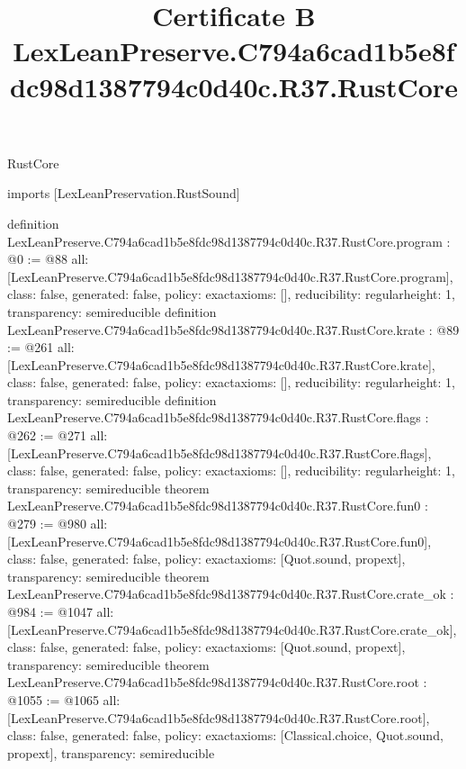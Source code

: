 \begin{lexlean}{RustCore}
\title{Certificate B LexLeanPreserve.C794a6cad1b5e8fdc98d1387794c0d40c.R37.RustCore}
\begin{coremodule}
imports [LexLeanPreservation.RustSound]

definition LexLeanPreserve.C794a6cad1b5e8fdc98d1387794c0d40c.R37.RustCore.program : @0 := @88 {
  all: [LexLeanPreserve.C794a6cad1b5e8fdc98d1387794c0d40c.R37.RustCore.program],
  class: false,
  generated: false,
  policy: exact{axioms: []},
  reducibility: regular{height: 1},
  transparency: semireducible
}
definition LexLeanPreserve.C794a6cad1b5e8fdc98d1387794c0d40c.R37.RustCore.krate : @89 := @261 {
  all: [LexLeanPreserve.C794a6cad1b5e8fdc98d1387794c0d40c.R37.RustCore.krate],
  class: false,
  generated: false,
  policy: exact{axioms: []},
  reducibility: regular{height: 1},
  transparency: semireducible
}
definition LexLeanPreserve.C794a6cad1b5e8fdc98d1387794c0d40c.R37.RustCore.flags : @262 := @271 {
  all: [LexLeanPreserve.C794a6cad1b5e8fdc98d1387794c0d40c.R37.RustCore.flags],
  class: false,
  generated: false,
  policy: exact{axioms: []},
  reducibility: regular{height: 1},
  transparency: semireducible
}
theorem LexLeanPreserve.C794a6cad1b5e8fdc98d1387794c0d40c.R37.RustCore.fun0 : @279 := @980 {
  all: [LexLeanPreserve.C794a6cad1b5e8fdc98d1387794c0d40c.R37.RustCore.fun0],
  class: false,
  generated: false,
  policy: exact{axioms: [Quot.sound, propext]},
  transparency: semireducible
}
theorem LexLeanPreserve.C794a6cad1b5e8fdc98d1387794c0d40c.R37.RustCore.crate_ok : @984 := @1047 {
  all: [LexLeanPreserve.C794a6cad1b5e8fdc98d1387794c0d40c.R37.RustCore.crate_ok],
  class: false,
  generated: false,
  policy: exact{axioms: [Quot.sound, propext]},
  transparency: semireducible
}
theorem LexLeanPreserve.C794a6cad1b5e8fdc98d1387794c0d40c.R37.RustCore.root : @1055 := @1065 {
  all: [LexLeanPreserve.C794a6cad1b5e8fdc98d1387794c0d40c.R37.RustCore.root],
  class: false,
  generated: false,
  policy: exact{axioms: [Classical.choice, Quot.sound, propext]},
  transparency: semireducible
}


\end{coremodule}
\end{lexlean}
